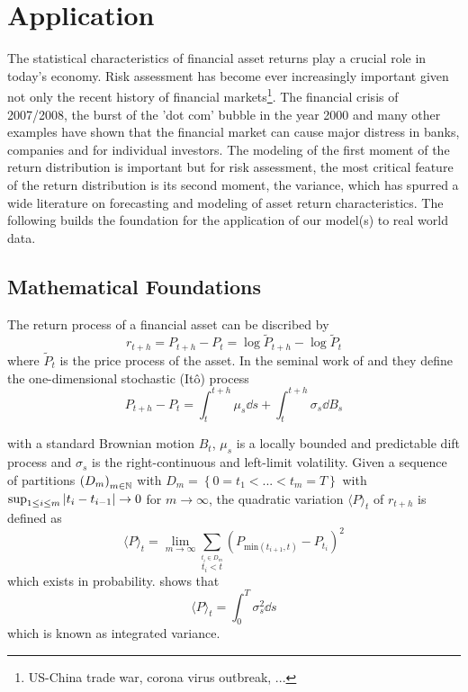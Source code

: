 \section{Application}
\label{CH:Application}

The statistical characteristics of financial asset returns play a crucial role in today's economy. Risk assessment has become ever increasingly important given not only the recent history of financial markets\footnote{US-China trade war, corona virus outbreak, ...}. The financial crisis of 2007/2008, the burst of the 'dot com' bubble in the year 2000 and many other examples have shown that the financial market can cause major distress in banks, companies and for individual investors. The modeling of the first moment of the return distribution is important but for risk assessment, the most critical feature of the return distribution is its second moment, the variance, which has spurred a wide literature on forecasting and modeling of asset return characteristics. The following builds the foundation for the application of our model(s) to real world data.



\subsection{Mathematical Foundations}

The return process of a financial asset can be discribed by 
\begin{equation}
    r_{t+h} = P_{t+h} - P_t = \log{\tilde P_{t+h}} - \log{\tilde P_t}
\end{equation}
where $\tilde P_t$ is the price process of the asset. In the seminal work of \cite{Andersen2001DistributionofVola} and \cite{Andersen2003ModelForecastVola} they define the one-dimensional stochastic (Itô) process
\begin{equation}
    P_{t+h} - P_t = \int_{t}^{t+h} \mu_s \dd s + \int_{t}^{t+h} \sigma_s \dd B_s
\end{equation}

with a standard Brownian motion $B_t$, $\mu_s$ is a locally bounded and predictable dift process and $\sigma_s$ is the right-continuous and left-limit volatility. Given a sequence of partitions $\left(D_m\right)_{m\in\mathbb{N}}$ with $D_m = \left\{0 = t_1 < ... < t_m = T\right\}$ with $\sup_{1 \leq i \leq m} \left| t_i - t_{i-1} \right| \to 0$ for $m \to \infty$, the quadratic variation $\langle P\rangle_t$ of $r_{t+h}$ is defined as
\begin{equation}
    \langle P\rangle_t = \lim_{m \to \infty} \sum_{\stackrel{t_i \in D_m}{t_i < t}} \left(P_{\text{min}\left(t_{i+1}, t\right)} - P_{t_i}\right)^2 \label{EQ:QuadraticVariation}
\end{equation}
which exists in probability. \cite{Billingsley2008} shows that
\begin{equation}
    \langle P\rangle_t = \int_{0}^{T} \sigma_s^2 \dd s \label{EQ:IntegratedVariance}
\end{equation}
which is known as integrated variance.

